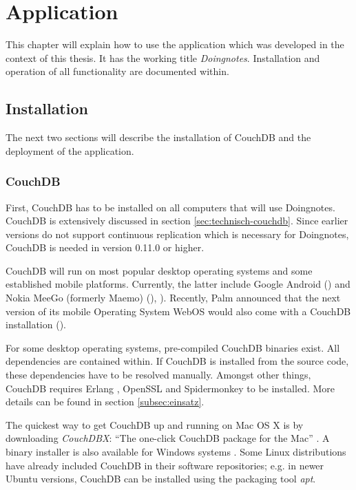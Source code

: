 \chapter{Application}
\label{chap:anwendung}

This chapter will explain how to use the application which was developed in the context of this thesis. It has the working title \textit{Doingnotes}. Installation and operation of all functionality are documented within.

\section{Installation}
\label{sec:installation}

The next two sections will describe the installation of CouchDB and the deployment of the application.

\subsection{CouchDB}

First, CouchDB has to be installed on all computers that will use Doingnotes. CouchDB is extensively discussed in section \ref{sec:technisch-couchdb}. Since earlier versions do not support continuous replication which is necessary for Doingnotes, CouchDB is needed in version 0.11.0 or higher.

CouchDB will run on most popular desktop operating systems and some established mobile platforms. Currently, the latter include Google Android (\cite{couchmobile:android}) and Nokia MeeGo (formerly Maemo) (\cite{couchmobile:nokia1}), \cite{couchmobile:nokia2}). Recently, Palm announced that the next version of its mobile Operating System WebOS would also come with a CouchDB installation (\cite{couchmobile:webos}).

For some desktop operating systems, pre-compiled CouchDB binaries exist. All dependencies are contained within. If CouchDB is installed from the source code, these dependencies have to be resolved manually. Amongst other things, CouchDB requires Erlang \cite{erlang:homepage}, OpenSSL \cite{openssl} and Spidermonkey \cite{spidermonkey} to be installed. More details can be found in section \ref{subsec:einsatz}.

The quickest way to get CouchDB up and running on Mac OS X is by downloading \textit{CouchDBX}: \enquote{The one-click CouchDB package for the Mac} \cite{couch:couchdbx}. A binary installer is also available for Windows systems \cite{couch:windows}. Some Linux distributions have already included CouchDB in their software repositories; e.g. in newer Ubuntu versions, CouchDB can be installed using the packaging tool \textit{apt}.

